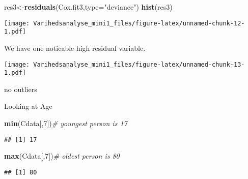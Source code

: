 \documentclass[
]{article}
\newenvironment{Shaded}{\begin{snugshade}}{\end{snugshade}}
\newcommand{\CommentTok}[1]{\textcolor[rgb]{0.56,0.35,0.01}{\textit{#1}}}
\newcommand{\DataTypeTok}[1]{\textcolor[rgb]{0.13,0.29,0.53}{#1}}
\newcommand{\DecValTok}[1]{\textcolor[rgb]{0.00,0.00,0.81}{#1}}
\newcommand{\KeywordTok}[1]{\textcolor[rgb]{0.13,0.29,0.53}{\textbf{#1}}}
\newcommand{\NormalTok}[1]{#1}
\newcommand{\OperatorTok}[1]{\textcolor[rgb]{0.81,0.36,0.00}{\textbf{#1}}}
\newcommand{\StringTok}[1]{\textcolor[rgb]{0.31,0.60,0.02}{#1}}
\begin{document}
\begin{Shaded}
\begin{Highlighting}[]
\NormalTok{res3<-}\KeywordTok{residuals}\NormalTok{(Cox.fit3,}\DataTypeTok{type=}\StringTok{"deviance"}\NormalTok{)}
\KeywordTok{hist}\NormalTok{(res3)}
\end{Highlighting}
\end{Shaded}

\texttt{[image: Varihedsanalyse\_mini1\_files/figure-latex/unnamed-chunk-12-1.pdf]}

We have one noticable high residual variable.

\begin{Shaded}
\end{Shaded}

\texttt{[image: Varihedsanalyse\_mini1\_files/figure-latex/unnamed-chunk-13-1.pdf]}

no outliers

Looking at Age

\begin{Shaded}
\begin{Highlighting}[]
\KeywordTok{min}\NormalTok{(Cdata[,}\DecValTok{7}\NormalTok{])}\CommentTok{# youngest person is 17}
\end{Highlighting}
\end{Shaded}

\begin{verbatim}
## [1] 17
\end{verbatim}

\begin{Shaded}
\begin{Highlighting}[]
\KeywordTok{max}\NormalTok{(Cdata[,}\DecValTok{7}\NormalTok{])}\CommentTok{# oldest person is 80}
\end{Highlighting}
\end{Shaded}

\begin{verbatim}
## [1] 80
\end{verbatim}
\end{document}
